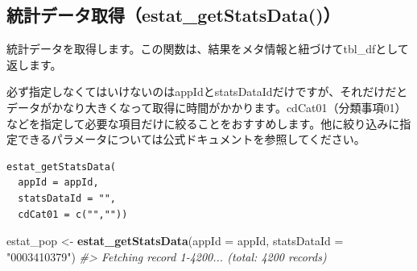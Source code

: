\documentclass[
  xelatex, ja=standard]{bxjsbook}
\newenvironment{Shaded}{\begin{snugshade}}{\end{snugshade}}
\newcommand{\AttributeTok}[1]{\textcolor[rgb]{0.13,0.29,0.53}{#1}}
\newcommand{\CommentTok}[1]{\textcolor[rgb]{0.56,0.35,0.01}{\textit{#1}}}
\newcommand{\FunctionTok}[1]{\textcolor[rgb]{0.13,0.29,0.53}{\textbf{#1}}}
\newcommand{\NormalTok}[1]{#1}
\newcommand{\OtherTok}[1]{\textcolor[rgb]{0.56,0.35,0.01}{#1}}
\newcommand{\StringTok}[1]{\textcolor[rgb]{0.31,0.60,0.02}{#1}}
\theoremstyle{definition}
\theoremstyle{definition}
\theoremstyle{definition}
\theoremstyle{definition}
\theoremstyle{remark}
\begin{document}
\hypertarget{ux7d71ux8a08ux30c7ux30fcux30bfux53d6ux5f97estat_getstatsdata}{%
\subsection{統計データ取得（estat\_getStatsData()）}\label{ux7d71ux8a08ux30c7ux30fcux30bfux53d6ux5f97estat_getstatsdata}}

統計データを取得します。この関数は、結果をメタ情報と紐づけてtbl\_dfとして返します。

必ず指定しなくてはいけないのはappIdとstatsDataIdだけですが、それだけだとデータがかなり大きくなって取得に時間がかかります。cdCat01（分類事項01）などを指定して必要な項目だけに絞ることをおすすめします。他に絞り込みに指定できるパラメータについては公式ドキュメントを参照してください。

\begin{verbatim}
estat_getStatsData(
  appId = appId,
  statsDataId = "",
  cdCat01 = c("",""))
\end{verbatim}

\begin{Shaded}
\begin{Highlighting}[]
\NormalTok{estat\_pop }\OtherTok{\textless{}{-}} \FunctionTok{estat\_getStatsData}\NormalTok{(}\AttributeTok{appId =}\NormalTok{ appId, }\AttributeTok{statsDataId =} \StringTok{"0003410379"}\NormalTok{)}
\CommentTok{\#\textgreater{} Fetching record 1{-}4200... (total: 4200 records)}
\end{Highlighting}
\end{Shaded}
\end{document}
